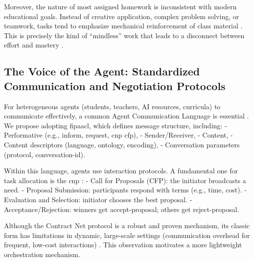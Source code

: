 \documentclass[12pt,a4paper]{article}
\begin{document}
Moreover, the nature of most assigned homework is inconsistent with modern educational goals. Instead of creative application, complex problem solving, or teamwork, tasks tend to emphasize mechanical reinforcement of class material \autocite{birch2018}. This is precisely the kind of \enquote{mindless} work that leads to a disconnect between effort and mastery \autocite{pope2013}.


\subsection{The Voice of the Agent: Standardized Communication and Negotiation Protocols}
For heterogeneous agents (students, teachers, AI resources, curricula) to communicate effectively, a common Agent Communication Language is essential \autocite{dua2025_acl,labrou1999,fipa2002,sarl_github}. We propose adopting \gls{fipaacl}, which defines message structure, including:
- Performative (e.g., inform, request, \gls{cnp} cfp),
- Sender/Receiver,
- Content,
- Content descriptors (language, ontology, encoding),
- Conversation parameters (protocol, conversation-id).

Within this language, agents use interaction protocols. A fundamental one for task allocation is the \gls{cnp} \autocite{wiki_cnp,ohare1998}:
- Call for Proposals (CFP): the initiator broadcasts a need.
- Proposal Submission: participants respond with terms (e.g., time, cost).
- Evaluation and Selection: initiator chooses the best proposal.
- Acceptance/Rejection: winners get accept-proposal; others get reject-proposal.

Although the Contract Net protocol is a robust and proven mechanism, its classic form has limitations in dynamic, large-scale settings (communication overhead for frequent, low-cost interactions) \autocite{ohare1998}. This observation motivates a more lightweight orchestration mechanism.
\end{document}
